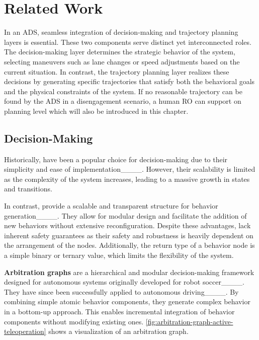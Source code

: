 \section{Related Work}
\label{sec:related_work}

In an \gls{ADS}, seamless integration of decision-making and trajectory planning layers is essential.
These two components serve distinct yet interconnected roles.
The decision-making layer determines the strategic behavior of the system, selecting maneuvers such as lane changes or speed adjustments based on the current situation.
In contrast, the trajectory planning layer realizes these decisions by generating specific trajectories that satisfy both the behavioral goals and the physical constraints of the system.
If no reasonable trajectory can be found by the \gls{ADS} in a disengagement scenario, a human \gls{RO} can support on planning level which will also be introduced in this chapter.
%

\subsection{Decision-Making}
\label{sec:decision_making}

Historically, \textbf{} have been a popular choice for decision-making due to their simplicity and ease of implementation____.
However, their scalability is limited as the complexity of the system increases, leading to a massive growth in states and transitions.

In contrast, \textbf{} provide a scalable and transparent structure for behavior generation____.
They allow for modular design and facilitate the addition of new behaviors without extensive reconfiguration.
Despite these advantages,  lack inherent safety guarantees as their safety and robustness is heavily dependent on the arrangement of the nodes.
Additionally, the return type of a behavior node is a simple binary or ternary value, which limits the flexibility of the system.

\textbf{Arbitration graphs} are a hierarchical and modular decision-making framework designed for autonomous systems originally developed for robot soccer____.
They have since been successfully applied to autonomous driving____.
By combining simple atomic behavior components, they generate complex behavior in a bottom-up approach.
This enables incremental integration of behavior components without modifying existing ones.
\cref{fig:arbitration-graph-active-teleoperation} shows a visualization of an arbitration graph.


